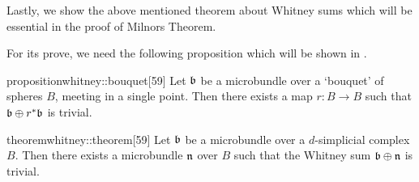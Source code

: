 \begin{myparagraph}
    Lastly, we show the above mentioned theorem about Whitney sums
    which will be essential in the proof of Milnors Theorem.

    For its prove, we need the following proposition
    which will be shown in .
\end{myparagraph}

\begin{mystatement}{proposition}{whitney::bouquet}[59]
    Let $\bb$ be a microbundle over a `bouquet' of spheres $B$, meeting in a single point.
    Then there exists a map $r: B \to B$ such that $\whitney{\bb}{\ind{r}\bb}$ is trivial.
\end{mystatement}

\begin{mystatement}{theorem}{whitney::theorem}[59]
    Let $\bb$ be a microbundle over a $d$-simplicial complex $B$.
    Then there exists a microbundle $\mathfrak{n}$ over $B$ such that
    the Whitney sum $\whitney{\bb}{\bn}$ is trivial.
\end{mystatement}

